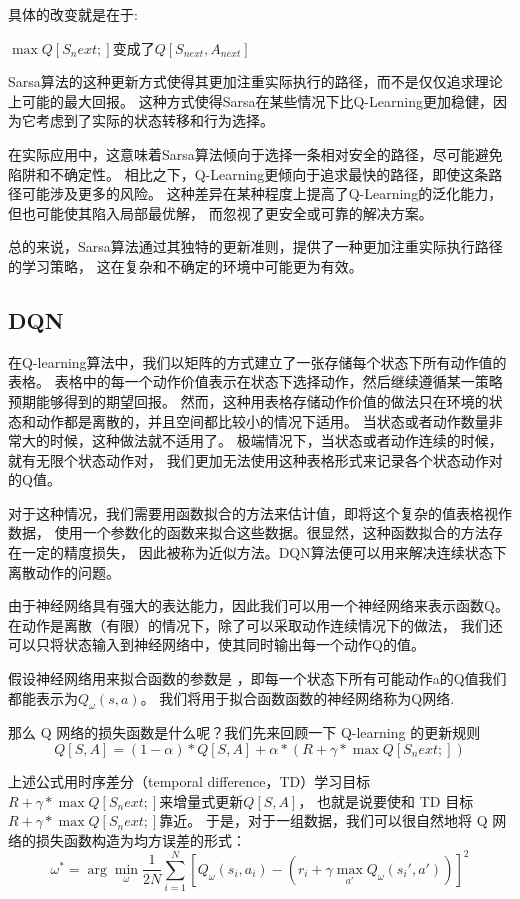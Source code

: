 \documentclass{thuemp}
\begin{document}
具体的改变就是在于:

$\max Q[S_next;]$变成了$Q[S_{next},A_{next}]$

Sarsa算法的这种更新方式使得其更加注重实际执行的路径，而不是仅仅追求理论上可能的最大回报。
这种方式使得Sarsa在某些情况下比Q-Learning更加稳健，因为它考虑到了实际的状态转移和行为选择。

在实际应用中，这意味着Sarsa算法倾向于选择一条相对安全的路径，尽可能避免陷阱和不确定性。
相比之下，Q-Learning更倾向于追求最快的路径，即使这条路径可能涉及更多的风险。
这种差异在某种程度上提高了Q-Learning的泛化能力，但也可能使其陷入局部最优解，
而忽视了更安全或可靠的解决方案。

总的来说，Sarsa算法通过其独特的更新准则，提供了一种更加注重实际执行路径的学习策略，
这在复杂和不确定的环境中可能更为有效。\\
\vbox{}
\subsection{DQN}
在Q-learning算法中，我们以矩阵的方式建立了一张存储每个状态下所有动作值的表格。
表格中的每一个动作价值表示在状态下选择动作，然后继续遵循某一策略预期能够得到的期望回报。
然而，这种用表格存储动作价值的做法只在环境的状态和动作都是离散的，并且空间都比较小的情况下适用。
当状态或者动作数量非常大的时候，这种做法就不适用了。
极端情况下，当状态或者动作连续的时候，就有无限个状态动作对，
我们更加无法使用这种表格形式来记录各个状态动作对的Q值。

对于这种情况，我们需要用函数拟合的方法来估计值，即将这个复杂的值表格视作数据，
使用一个参数化的函数来拟合这些数据。很显然，这种函数拟合的方法存在一定的精度损失，
因此被称为近似方法。DQN算法便可以用来解决连续状态下离散动作的问题。

由于神经网络具有强大的表达能力，因此我们可以用一个神经网络来表示函数Q。\cite{csdn-dqn}
在动作是离散（有限）的情况下，除了可以采取动作连续情况下的做法，
我们还可以只将状态输入到神经网络中，使其同时输出每一个动作Q的值。

假设神经网络用来拟合函数的参数是 ，即每一个状态下所有可能动作a的Q值我们都能表示为$Q_{\omega}(s, a)$。
我们将用于拟合函数函数的神经网络称为Q网络.

那么 Q 网络的损失函数是什么呢？我们先来回顾一下 Q-learning 的更新规则
$$Q[S,A]=(1-\alpha)*Q[S,A]+\alpha*(R+\gamma*\max Q[S_next;])$$

上述公式用时序差分（temporal difference，TD）学习目标$R+\gamma*\max Q[S_next;]$来增量式更新$Q[S,A]$，
也就是说要使和 TD 目标$R+\gamma*\max Q[S_next;]$靠近。
于是，对于一组数据，我们可以很自然地将 Q 网络的损失函数构造为均方误差的形式：
$$\omega^*=\arg\min_\omega\frac{1}{2N}\sum_{i=1}^N\left[Q_\omega\left(s_i,a_i\right)-\left(r_i+\gamma\max_{a'}Q_\omega\left(s_i',a'\right)\right)\right]^2$$
\end{document}
